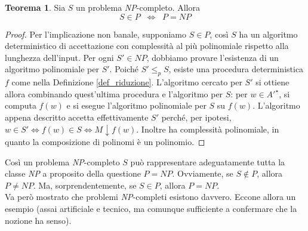 \documentclass[12pt,a4paper]{report}
\theoremstyle{definition}
\newtheorem{teo}{Teorema}[section]  %
\begin{document}
\begin{teo}\label{teo_NP-completo}
Sia $S$ un problema \emph{NP}-completo. Allora
$$S \in P \; \; \Longleftrightarrow \; \; P=NP$$
\begin{proof}
Per l'implicazione non banale, supponiamo $S \in P$, così $S$ ha un algoritmo deterministico di accettazione con complessità al più polinomiale rispetto alla lunghezza dell'input. Per ogni $S' \in NP$, dobbiamo provare l'esistenza di un algoritmo polinomiale per $S'$. Poiché $S' \leq_p S$, esiste una procedura deterministica $f$ come nella Definizione \ref{def_riduzione}. L'algoritmo cercato per $S'$ si ottiene allora combinando quest'ultima procedura e l'algoritmo per $S$: per $w \in A'^{\star}$, si computa $f(w)$ e si esegue l'algoritmo polinomiale per $S$ su $f(w)$. L'algoritmo appena descritto accetta effettivamente $S'$ perché, per ipotesi, $w \in S' \Leftrightarrow f(w) \in S \Leftrightarrow M \downarrow f(w)$. Inoltre ha complessità polinomiale, in quanto la composizione di polinomi è un polinomio.
\end{proof}
\end{teo}

Così un problema \emph{NP}-completo $S$ può rappresentare adeguatamente tutta la classe \emph{NP} a proposito della questione $P=NP$. Ovviamente, se $S \not\in P$, allora $P \neq NP$. Ma, sorprendentemente, se $S \in P$, allora $P=NP$.\\
Va però mostrato che problemi \emph{NP}-completi esistono davvero. Eccone allora un esempio (assai artificiale e tecnico, ma comunque sufficiente a confermare che la nozione ha senso).
\end{document}

